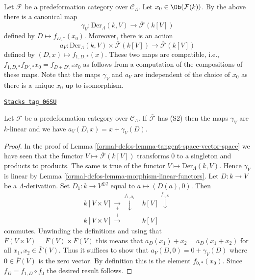 \medskip\noindent
Let $\mathcal{F}$ be a predeformation category over $\mathcal{C}_\Lambda$.
Let $x_0 \in \Ob(\mathcal{F}(k))$. By the above there is a canonical
map
$$
\gamma_V :
\text{Der}_\Lambda(k, V)
\longrightarrow
\overline{\mathcal{F}}(k[V])
$$
defined by $D \mapsto f_{D, *}(x_0)$. Moreover, there is an action
$$
a_V : \text{Der}_\Lambda(k, V) \times \overline{\mathcal{F}}(k[V])
\longrightarrow
\overline{\mathcal{F}}(k[V])
$$
defined by $(D, x) \mapsto f_{1, D, *}(x)$. These two maps are compatible,
i.e., $f_{1, D, *}f_{D', *}x_0 = f_{D + D', *}x_0$ as follows from a
computation of the compositions of these maps. Note that the maps
$\gamma_V$ and $a_V$ are independent of the choice of $x_0$ as there
is a unique $x_0$ up to isomorphism.

\begin{lemma}
\label{formal-defos-lemma-action-linear}
\href{https://stacks.math.columbia.edu/tag/06SU}{\texttt{Stacks tag 06SU}}

Let $\mathcal{F}$ be a predeformation category over $\mathcal{C}_\Lambda$.
If $\overline{\mathcal{F}}$ has (S2) then the maps $\gamma_V$ are
$k$-linear and we have $a_V(D, x) = x + \gamma_V(D)$.
\end{lemma}

\begin{proof}
In the proof of
Lemma \ref{formal-defos-lemma-tangent-space-vector-space}
we have seen that the functor $V \mapsto \overline{\mathcal{F}}(k[V])$
transforms $0$ to a singleton and products to products. The same is
true of the functor $V \mapsto \text{Der}_\Lambda(k, V)$.
Hence $\gamma_V$ is linear by
Lemma \ref{formal-defos-lemma-morphism-linear-functors}.
Let $D : k \to V$ be a $\Lambda$-derivation.
Set $D_1 : k \to V^{\oplus 2}$ equal to $a \mapsto (D(a), 0)$.
Then
$$
\begin{array}{cc}k[V \times V] \underset{+}{\longrightarrow}\overset{f_{1, D_1}}{\downarrow} & k[V] \overset{f_{1, D}}{\downarrow} \\ k[V \times V] \overset{+}{\longrightarrow} & k[V]\end{array}
$$
commutes. Unwinding the definitions and using that
$\overline{F}(V \times V) = \overline{F}(V) \times \overline{F}(V)$
this means that $a_D(x_1) + x_2 = a_D(x_1 + x_2)$ for all
$x_1, x_2 \in \overline{F}(V)$. Thus it suffices to show that
$a_V(D, 0) = 0 + \gamma_V(D)$ where $0 \in \overline{F}(V)$ is
the zero vector. By definition this is the element $f_{0, *}(x_0)$.
Since $f_D = f_{1, D} \circ f_0$ the desired result follows.
\end{proof}

